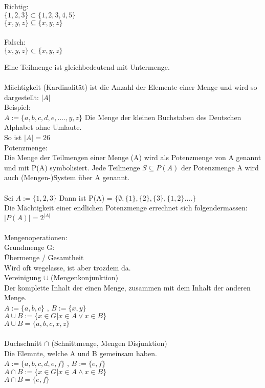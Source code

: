 \documentclass[../gruppenarbeit_1.tex]{subfiles}
\begin{document}
Richtig:\\
$\{1,2,3\} \subset \{1,2,3,4,5\}$\\
$\{x,y,z\} \subseteq \{x,y,z\}$\\
\\
Falsch: \\
$\{x,y,z\} \subset \{x,y,z\}$

Eine Teilmenge ist gleichbedeutend mit Untermenge.\\
\\

Mächtigkeit (Kardinalität) ist die Anzahl der Elemente einer Menge und wird so dargestellt: $|A|$\\

Beispiel:\\
$A := \{a,b,c,d,e,....,y,z\}$ Die Menge der kleinen Buchstaben des Deutschen Alphabet ohne Umlaute.\\
So ist $|A| = 26$\\

Potenzmenge:\\
Die Menge der Teilmengen einer Menge (A) wird als Potenzmenge von A genannt und mit P(A) symbolisiert.
Jede Teilmenge $S \subseteq P(A)$ der Potenzmenge A wird auch (Mengen-)System über A genannt.\\
\\
Sei $A := \{1,2,3\}$ Dann ist P(A) = $\{\emptyset, \{1\},\{2\},\{3\},\{1,2\}....\}$\\
Die Mächtigkeit einer endlichen Potenzmenge errechnet sich folgendermassen:\\
$|P(A)| = 2^{|A|}$\\
\\

Mengenoperationen:\\
Grundmenge G:\\
Übermenge / Gesamtheit\\
Wird oft wegelasse, ist aber trozdem da.
\\

Vereinigung $\cup$ (Mengenkonjunktion)\\
Der komplette Inhalt der einen Menge, zusammen mit dem Inhalt der anderen Menge.\\
$A := \{a,b,c\}$ , $B := \{x,y\}$\\
$A \cup B := \{x \in G | x \in A \vee x \in B\}$\\
$A \cup B = \{a,b,c,x,z\}$\\
\\

Duchschnitt $\cap$ (Schnittmenge, Mengen Disjunktion)\\
Die Elemnte, welche A und B gemeinsam haben.\\
$A := \{a,b,c,d,e,f\}$ , $B := \{e,f\}$\\
$A \cap B := \{x \in G | x \in A \wedge x \in B\}$\\
$A \cap B = \{e,f\}$\\
\\
\end{document}
